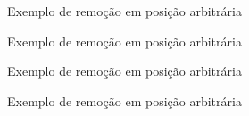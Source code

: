 \begin{frame}[fragile]{Exemplo de remoção em posição arbitrária}
\end{frame}

\begin{frame}[fragile]{Exemplo de remoção em posição arbitrária}
\end{frame}

\begin{frame}[fragile]{Exemplo de remoção em posição arbitrária}
\end{frame}

\begin{frame}[fragile]{Exemplo de remoção em posição arbitrária}
\end{frame}

